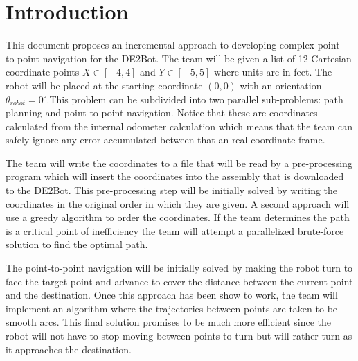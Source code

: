 \documentclass[11pt,conference,onecolumn]{article} %
\begin{document}
\section*{Introduction}
This document proposes an incremental approach to developing complex point-to-point navigation for the DE2Bot. The team will be given a list of 12 Cartesian coordinate points $X \in [-4,4]$ and $Y \in [-5,5]$ where units are in feet. The robot will be placed at the starting coordinate $(0,0)$ with an orientation $\theta_{robot} = 0^{\circ}$.This problem can be subdivided into two parallel sub-problems: path planning and point-to-point navigation. Notice that these are coordinates calculated from the internal odometer calculation which means that the team can safely ignore any error accumulated between that an real coordinate frame.\par
The team will write the coordinates to a file that will be read by a pre-processing program which will insert the coordinates into the assembly that is downloaded to the DE2Bot. This pre-processing step will be initially solved by writing the coordinates in the original order in which they are given. A second approach will use a greedy algorithm to order the coordinates. If the team determines the path is a critical point of inefficiency the team will attempt a parallelized brute-force solution to find the  optimal path.\par
The point-to-point navigation will be initially solved by making the robot turn to face the target point and advance to cover the distance between the current point and the destination. Once this approach has been show to work, the team will implement an algorithm where the trajectories between points are taken to be smooth arcs. This final solution promises to be much more efficient since the robot will not have to stop moving between points to turn but will rather turn as it approaches the destination.\par
\end{document}
